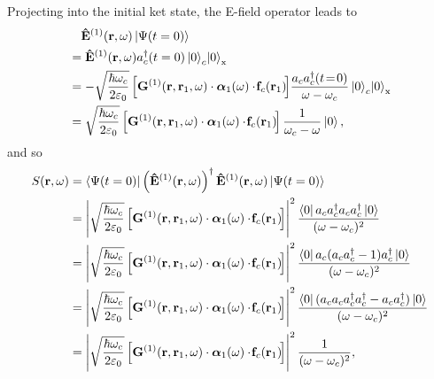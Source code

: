 Projecting into the initial ket state, the E-field operator leads to
\begin{align}
\!\!\!\!\!\!\!\!\! &\quad\mathbf{\hat{E}}^{(1)}({\bf r},\omega)\ket{\Psi(t=0)}\nonumber \\
&= \mathbf{\hat{E}}^{(1)}({\bf r},\omega)
 a^{\dagger}_c(t=0)\ket{0}_{c}\! \ket 0_{\rm x}\nonumber\\
&= -\sqrt{\frac{\hbar
\omega_c}{2\varepsilon_0}}\left [
\mathbf{G}^{(1)}(\mathbf{r},\mathbf{r}_1,\omega)\cdot {\bm \alpha}_1(\omega) \cdot \!
\mathbf{f}_c(\mathbf{r}_1) \! \right]\!
\frac{a_c a^{\dagger}_c(t\!=\!0)}{\omega-\omega_c}\ket
{0}_{c}\!\ket 0_{\rm x}\nonumber\\
&= \sqrt{\frac{\hbar
\omega_c}{2\varepsilon_0}}\left [\mathbf{G}^{(1)}(\mathbf{r},\mathbf{r}_1,\omega)\cdot {\bm \alpha}_1(\omega) \cdot \!
\mathbf{f}_c(\mathbf{r}_1) \! \right]\frac{1}{\omega_c-\omega}\ket{0},
\end{align}
and so
\begin{align}
S({\bf r},\omega)&= \bra{\Psi(t=0)}\left(\mathbf{\hat{E}}^{(1)}({\bf
r},\omega)\right)^\dagger \mathbf{\hat{E}}^{(1)}({\bf
r},\omega)\ket{\Psi(t=0)}  \nonumber\\
&= \left |\sqrt{\frac{\hbar
\omega_c}{2\varepsilon_0}}\left [
\mathbf{G}^{(1)}(\mathbf{r},\mathbf{r}_1,\omega)\cdot {\bm \alpha}_1(\omega) \cdot \!
\mathbf{f}_c(\mathbf{r}_1) \!\right
]\right
|^2\frac{\bra{0}a_c \adag_c a_c \adag_c\ket{0}}{(\omega-\omega_c)^2}\nonumber \\
&= \left |\sqrt{\frac{\hbar
\omega_c}{2\varepsilon_0}}\left [
\mathbf{G}^{(1)}(\mathbf{r},\mathbf{r}_1,\omega)\cdot {\bm \alpha}_1(\omega) \cdot \!
\mathbf{f}_c(\mathbf{r}_1) \!\right
]\right
|^2\frac{\bra{0}a_c (a_c\adag_c -1) \adag_c\ket{0}}{(\omega-\omega_c)^2}\nonumber\\
&= \left |\sqrt{\frac{\hbar
\omega_c}{2\varepsilon_0}}\left [
\mathbf{G}^{(1)}(\mathbf{r},\mathbf{r}_1,\omega)\cdot {\bm \alpha}_1(\omega) \cdot \!
\mathbf{f}_c(\mathbf{r}_1) \!\right
]\right
|^2\frac{\bra{0}(a_c a_c\adag_c \adag_c-a_c\adag_c)\ket{0}}{(\omega-\omega_c)^2}\nonumber\\
&= \left |\sqrt{\frac{\hbar
\omega_c}{2\varepsilon_0}}\left [
\mathbf{G}^{(1)}(\mathbf{r},\mathbf{r}_1,\omega)\cdot {\bm \alpha}_1(\omega) \cdot \!
\mathbf{f}_c(\mathbf{r}_1) \!\right
]\right
|^2\frac{1}{(\omega-\omega_c)^2},\label{eq:s_init_f_0}
\end{align}
